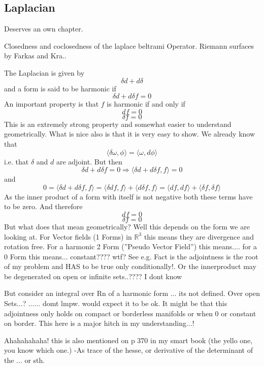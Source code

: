 \subsection{Laplacian}
Deserves an own chapter.

Closedness and coclosedness of the laplace beltrami Operator. Riemann surfaces by Farkas and Kra..

The Laplacian is given by
\[\delta d + d \delta\]
and a form is said to be harmonic if
\[\delta d + d \delta f = 0\]
An important property is that $f$ is harmonic if and only if
\[df = 0\]
\[\delta f = 0\]
This is an extremely strong property and somewhat easier to understand geometrically. What is nice also is that it is very easy to show. We already know that
\[\langle \delta \omega,\phi\rangle = \langle \omega, d\phi\rangle\]
i.e. that $\delta$ and $d$ are adjoint. But then
\[\delta d + d \delta f = 0 \Rightarrow \langle \delta d + d \delta f, f\rangle = 0\]
and
\[0 = \langle \delta d + d \delta f, f\rangle = \langle \delta d f, f\rangle  + \langle d \delta f, f\rangle  = \langle d f, d f\rangle +\langle \delta f, \delta f\rangle\]
As the inner product of a form with itself is not negative both these terms have to be zero. And therefore
\[df = 0\]
\[\delta f = 0\]
But what does that mean geometrically? Well this depends on the form we are looking at. For Vector fields (1 Forms) in $\mathbb R^3$ this means they are divergence and rotation free. For a harmonic 2 Form (''Pseudo Vector Field'') this means.... for a 0 Form this means... constant???? wtf?
See e.g. %
Fact is the adjointness is the root of my problem and HAS to be true only conditionally!. Or the innerproduct may be degenerated on open or infinite sets..???? I dont know

But consider an integral over Rn of a harmonic form ... its not defined. Over open Sets...? ...... domt lmpw. would expect it to be ok.
It might be that this adjointness only holds on compact or borderless manifolds or when 0 or constant on border. This here is a major hitch in my understanding...! 

Ahahahahaha! this is also mentioned on p 370 in my smart book (the yello one, you know which one.)
-As trace of the hesse, or derivative of the determinant of the ... or sth.